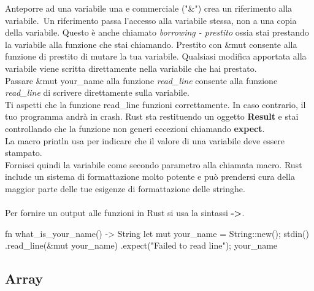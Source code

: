 \documentclass[11pt,a4paper]{article}
\begin{document}
Anteporre ad una variabile una e commerciale ("\&") crea un riferimento alla variabile.\
Un riferimento passa l'accesso alla variabile stessa, non a una copia della variabile. Questo è anche chiamato \textit{borrowing - prestito} ossia stai prestando la variabile alla funzione che stai chiamando. Prestito con \&mut consente alla funzione di prestito di mutare la tua variabile. Qualsiasi modifica apportata alla variabile viene scritta direttamente nella variabile che hai prestato.\\
Passare \&mut your\_name alla funzione \textit{read\_line} consente alla funzione \textit{read\_line} di scrivere direttamente sulla variabile.\\
Ti aspetti che la funzione read\_line funzioni correttamente. In caso contrario, il tuo programma andrà in crash. Rust sta restituendo un oggetto \textbf{Result} e stai controllando che la funzione non generi eccezioni chiamando \textbf{expect}.\\
La macro println usa {} per indicare che il valore di una variabile deve essere stampato.\\
Fornisci quindi la variabile come secondo parametro alla chiamata macro. Rust include un sistema di formattazione molto potente e può prendersi cura della maggior parte delle tue esigenze di formattazione delle stringhe.\\
\\
Per fornire un output alle funzioni in Rust si usa la sintassi \textbf{->}.
\begin{rust}
fn what_is_your_name() -> String {
	let mut your_name = String::new();
	stdin()
	.read_line(&mut your_name)
	.expect("Failed to read line");
	your_name
}
\end{rust}

\subsection{Array}
\end{document}
